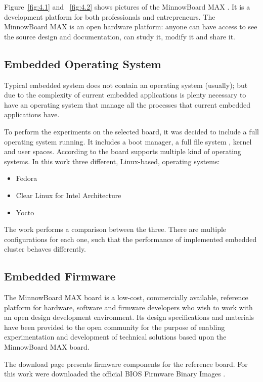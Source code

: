 Figure~\ref{fig:4.1} and ~\ref{fig:4.2} shows pictures of the MinnowBoard MAX .
It is a development platform for both professionals and entrepreneurs. The
MinnowBoard MAX is an open hardware platform: anyone can have access to see the
source design and documentation, can study it, modify it and share it.

\subsection{Embedded Operating System} 

Typical embedded system does not contain an operating system (usually); but due
to the complexity of current embedded applications is plenty necessary to have
an operating system that manage all the processes that current embedded
applications have. 

To perform the experiments on the selected board, it was decided to include a
full operating system running. It includes a boot manager, a full file system ,
kernel and user spaces. According to \cite{minnowboard} the board supports
multiple kind of operating systems. In this work three different, Linux-based,
operating systems:

\begin{itemize}
    \item Fedora \cite{fedora}
    \item Clear Linux for Intel Architecture \cite{clear-linux}
    \item Yocto \cite{yocto-project}
\end{itemize}

The work performs a comparison between the three. There are multiple 
configurations for each one, such that the performance of implemented embedded
cluster behaves differently. 

\subsection{Embedded Firmware}

The  MinnowBoard MAX  board is a low-cost, commercially available, reference
platform for hardware, software and firmware developers who wish to work with
an open design development environment. Its design specifications
and materials have been provided to the open community for the purpose of
enabling experimentation and development of technical solutions based upon
the  MinnowBoard MAX board.

The download page presents firmware components for the reference board. For
this work were downloaded the official BIOS Firmware Binary Images
\cite{minnowmax-firmware}.

